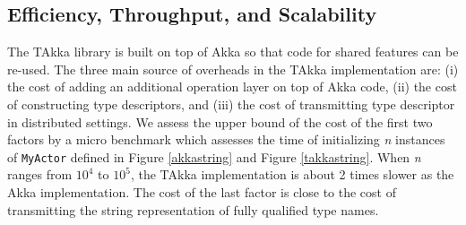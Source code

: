 \subsection{Efficiency, Throughput, and Scalability}
\label{efficiency}

The TAkka library is built on top of Akka so that code for shared features 
can be re-used.  The three main source of overheads in the TAkka implementation
are: (i) the cost of adding an additional operation layer on top of Akka 
code, (ii) the cost of constructing type descriptors, and (iii) the cost of 
transmitting type descriptor in distributed settings. We assess the upper bound 
of the cost of the first two factors by a micro benchmark which assesses the 
time of initializing {\it n} instances of {\tt MyActor} defined in Figure
\ref{akkastring} and Figure \ref{takkastring}. When {\it n} ranges from 
$10^4$ to $10^5$, the TAkka implementation is about 2 times slower as
the Akka implementation.  The cost of the last factor is close to the cost of
transmitting the string representation of fully qualified type names.

